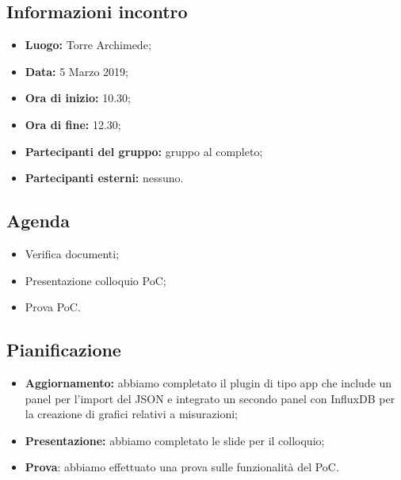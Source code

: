 \subsection{Informazioni incontro}
\begin{itemize}
	\item { \textbf{Luogo:} Torre Archimede};
	\item { \textbf{Data:} 5 Marzo 2019};
	\item { \textbf{Ora di inizio:} 10.30};
	\item { \textbf{Ora di fine:} 12.30};
	\item { \textbf{Partecipanti del gruppo:} gruppo al completo};
	\item { \textbf{Partecipanti esterni:} nessuno}.
\end{itemize}


\subsection{Agenda}
\begin{itemize}
	\item {Verifica documenti;}
	\item {Presentazione colloquio PoC;}
	\item {Prova PoC.}
\end{itemize}

\subsection{Pianificazione}
\begin{itemize}
	\item { \textbf{Aggiornamento:} abbiamo completato il plugin di tipo app che include un panel per l'import del JSON e integrato un secondo panel con InfluxDB per la creazione di grafici relativi a misurazioni;}
	\item { \textbf{Presentazione:} abbiamo completato le slide per il colloquio;}
	\item { \textbf{Prova}: abbiamo effettuato una prova sulle funzionalità del PoC.}
\end{itemize}

